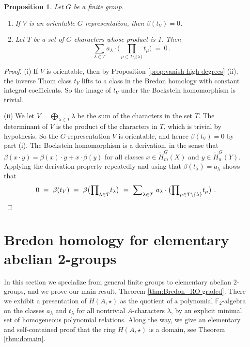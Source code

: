 \documentclass{amsart}[12pt]
\newcommand{\mF}{{\mathbb F}}
\numberwithin{equation}{section}
\newtheorem{prop}[equation]{Proposition}
\theoremstyle{definition}
\begin{document}
\begin{prop}\label{prop:x-relation}
  Let $G$ be a finite group.
  \begin{enumerate}[\em (i)]
  \item If $V$ is an orientable $G$-representation, then $\beta(t_V)=0$.
  \item Let $T$ be a set of $G$-characters whose product is 1. Then
    \[
      \sum_{\lambda\in T} a_\lambda \cdot \bigg( \prod_{\mu\in T\setminus\{\lambda\}} t_\mu\bigg)
      \ = \ 0\ .\]
\end{enumerate}
\end{prop}
\begin{proof}
  (i) If $V$ is orientable, then by Proposition \ref{prop:vanish high degrees} (ii),
  the inverse Thom class $t_V$ lifts to a class in 
  the Bredon homology with constant integral coefficients.
  So the image of $t_V$ under the Bockstein homomorphism is trivial.

  
  (ii) We let $V=\bigoplus_{\lambda\in T}\lambda$ be the sum of the characters in the set $T$.
  The determinant of $V$ is the product of the characters in $T$, which is trivial
  by hypothesis. So the $G$-representation $V$ is orientable, and hence $\beta(t_V)=0$
  by part (i).
  The Bockstein homomorphism is a derivation, in the sense that
  $\beta(x\cdot y) =  \beta(x)\cdot y + x\cdot \beta(y)$
  for all classes $x\in\tilde H_m^G(X)$ and $y\in\tilde H_n^G(Y)$.
  Applying the derivation property repeatedly and using that $\beta(t_\lambda)=a_\lambda$ shows that
\[  0 \ = \ \beta(t_V) \ = \  \beta\big({\prod}_{\lambda\in T}t_\lambda\big) \ = \
  {\sum}_{\lambda\in T}\ a_\lambda\cdot \big( {\prod}_{\mu\in T\setminus\{\lambda\}} t_\mu\big) \ .
  \vspace*{-.5cm} \]
\end{proof}


\section{Bredon homology for elementary abelian 2-groups}

In this section we specialize from general finite groups to elementary abelian
$2$-groups, and we prove our main result, Theorem \ref{thm:Bredon_RO-graded}.
There we exhibit a presentation of $H(A,\star)$ as the quotient of a
polynomial $\mF_2$-algebra on the classes $a_\lambda$ and $t_\lambda$
for all nontrivial $A$-characters $\lambda$,
by an explicit minimal set of homogeneous polynomial relations.
Along the way, we give an elementary and self-contained proof
that the ring $H(A,\star)$ is a domain, see Theorem \ref{thm:domain}.
\end{document}
